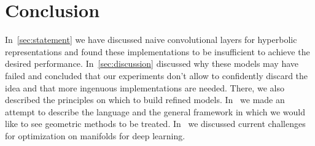 \chapter{Conclusion}

In~\autoref{sec:statement} we have discussed naive convolutional layers for
hyperbolic representations and found these implementations to be insufficient
to achieve the desired performance. In~\autoref{sec:discussion} discussed why
these models may have failed and concluded that our experiments don't allow to
confidently discard the idea and that more ingenuous implementations are
needed.  There, we also described the principles on which to build refined
models.  In~ we made an attempt to describe the
language and the general framework in which we would like to see geometric
methods to be treated.  In~ we discussed current challenges
for optimization on manifolds for deep learning.
